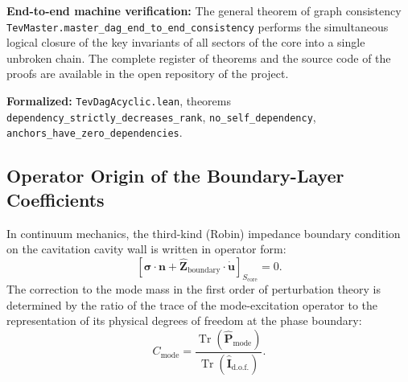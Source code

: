 \documentclass[11pt,a4paper]{article}
\theoremstyle{definition}
\theoremstyle{remark}
\begin{document}
\noindent\small\textbf{End-to-end machine verification:} The general theorem of graph consistency \texttt{TevMaster.master\_dag\_end\_to\_end\_consistency} performs the simultaneous logical closure of the key invariants of all sectors of the core into a single unbroken chain. The complete register of theorems and the source code of the proofs are available in the open repository of the project.

\noindent\small\textbf{Formalized:} \texttt{TevDagAcyclic.lean}, theorems \texttt{dependency\_strictly\_decreases\_rank}, \texttt{no\_self\_dependency}, \texttt{anchors\_have\_zero\_dependencies}.

\subsection{Operator Origin of the Boundary-Layer Coefficients}

In continuum mechanics, the third-kind (Robin) impedance boundary condition on the cavitation cavity wall is written in operator form:
\begin{equation}
	\left[ \boldsymbol{\sigma} \cdot \mathbf{n} + \hat{\mathbf{Z}}_{\mathrm{boundary}} \cdot \dot{\mathbf{u}} \right]_{S_{\mathrm{core}}} = 0.
\end{equation}
The correction to the mode mass in the first order of perturbation theory is determined by the ratio of the trace of the mode-excitation operator to the representation of its physical degrees of freedom at the phase boundary:
\begin{equation}
	C_{\mathrm{mode}} = \frac{\operatorname{Tr}(\hat{\mathbf{P}}_{\mathrm{mode}})}{\operatorname{Tr}(\hat{\mathbf{I}}_{\mathrm{d.o.f.}})}.
\end{equation}
\end{document}
